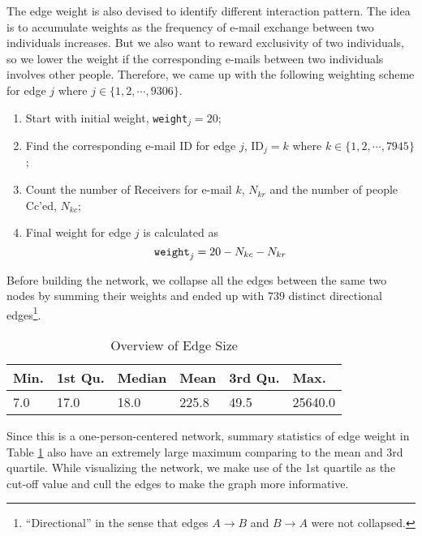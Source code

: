 The edge weight is also devised to identify different interaction pattern. The idea is to accumulate weights as the frequency of e-mail exchange between two individuals increases. But we also want to reward exclusivity of two individuals, so we lower the weight if the corresponding e-mails between two individuals involves other people. Therefore, we came up with the following weighting scheme for edge $j$ where $j \in \{1,2 , \cdots, 9306\}$.\begin{enumerate}
\item Start with initial weight, \verb+weight+$_j = 20$;
\item Find the corresponding e-mail ID for edge $j$, ID$_j = k$  where $k \in \{1, 2, \cdots, 7945\}$;
\item Count the number of Receivers for e-mail $k$, $N_{kr}$ and the number of people Cc'ed, $N_{kc}$;
\item Final weight for edge $j$ is calculated as
\begin{equation}
\verb+weight+_j = 20 - N_{kc} - N_{kr}
\end{equation}
\end{enumerate}
Before building the network, we collapse all the edges between the same two nodes by summing their weights and ended up with $739$ distinct directional edges\footnote{``Directional'' in the sense that edges $A \rightarrow B$ and $B \rightarrow A$ were not collapsed. }.
\begin{table}[ht]
\caption{Overview of Edge Size}
\label{tab:edge_size}
\centering
\begin{tabular}{llllll}
Min. &1st Qu. & Median&    Mean& 3rd Qu.  &  Max. \\ \hline
   7.0    &17.0  &  18.0 &  225.8   & 49.5&25640.0 
 \end{tabular}
\end{table} 

Since this is a one-person-centered network, summary statistics of edge weight in Table \ref{tab:edge_size} also have an extremely large maximum comparing to the mean and 3rd quartile. While visualizing the network, we make use of the 1st quartile as the cut-off value and cull the edges to make the graph more informative.